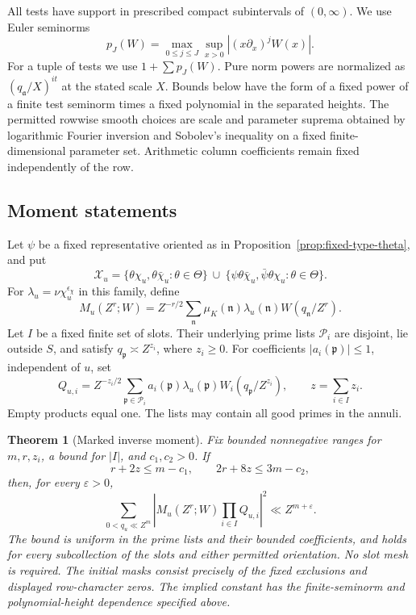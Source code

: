 \documentclass[11pt,a4paper]{article}
\numberwithin{equation}{section}
\newtheorem{theorem}{Theorem}[section]
\theoremstyle{definition}
\theoremstyle{remark}
\newcommand{\eps}{\varepsilon}
\begin{document}
All tests have support in prescribed compact subintervals of
$(0,\infty)$.  We use Euler seminorms
\[
 p_J(W)=\max_{0\le j\le J}\sup_{x>0}|(x\partial_x)^jW(x)|.
\]
For a tuple of tests we use $1+\sum p_J(W)$.
Pure norm powers are normalized as $(q_{\mathfrak a}/X)^{it}$ at the
stated scale $X$.  Bounds below have the form of a fixed power of a finite
test seminorm times a fixed polynomial in the separated heights.
The permitted rowwise smooth choices are scale and parameter suprema
obtained by logarithmic Fourier inversion and Sobolev's inequality on a
fixed finite-dimensional parameter set.  Arithmetic column coefficients remain fixed independently of the row.

\subsection{Moment statements}

Let $\psi$ be a fixed representative oriented as in
Proposition~\ref{prop:fixed-type-theta}, and put
\begin{equation}\label{eq:can-presentations}
 \mathcal X_u=
 \{\theta\chi_u,\theta\bar\chi_u:\theta\in\Theta\}
 \ \cup\
 \{\psi\theta\bar\chi_u,\bar\psi\theta\chi_u:\theta\in\Theta\}.
\end{equation}
For $\lambda_u=\nu\chi_u^{\epsilon_\chi}$ in this family, define
\[
 M_u(Z^r;W)=Z^{-r/2}\sum_{\mathfrak n}
    \mu_K(\mathfrak n)\lambda_u(\mathfrak n)
    W(q_{\mathfrak n}/Z^r).
\]
Let $I$ be a fixed finite set of slots.  Their underlying prime lists
$\mathcal P_i$ are disjoint, lie outside $S$, and satisfy
$q_{\mathfrak p}\asymp Z^{z_i}$, where $z_i\ge0$.
For coefficients $|a_i(\mathfrak p)|\le1$, independent of $u$, set
\[
 Q_{u,i}=Z^{-z_i/2}\sum_{\mathfrak p\in\mathcal P_i}
    a_i(\mathfrak p)\lambda_u(\mathfrak p)
    W_i(q_{\mathfrak p}/Z^{z_i}),
 \qquad z=\sum_{i\in I}z_i.
\]
Empty products equal one.  The lists may contain all good primes in the annuli.

\begin{theorem}[Marked inverse moment]\label{thm:can-inverse}
Fix bounded nonnegative ranges for $m,r,z_i$, a bound for $|I|$, and
$c_1,c_2>0$.  If
\[
 r+2z\le m-c_1,\qquad 2r+8z\le3m-c_2,
\]
then, for every $\eps>0$,
\begin{equation}\label{eq:can-inverse}
 \sum_{0<q_u\ll Z^m}
 \left|M_u(Z^r;W)\prod_{i\in I}Q_{u,i}\right|^2
 \ll Z^{m+\eps}.
\end{equation}
The bound is uniform in the prime lists and their bounded coefficients,
and holds for every subcollection of the slots and either permitted
orientation.  No slot mesh is required.  The initial masks consist precisely of the fixed exclusions and
displayed row-character zeros.
The implied constant has the finite-seminorm and polynomial-height
dependence specified above.
\end{theorem}
\end{document}
